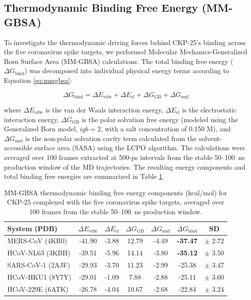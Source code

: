 \documentclass[pharmaceuticals,article,submit,pdftex,moreauthors]{Definitions/mdpi}
\begin{document}
\subsection{Thermodynamic Binding Free Energy (MM-GBSA)}
\label{sec:MM-GBSA}
To investigate the thermodynamic driving forces behind CKP-25's binding across the five coronavirus spike targets, we performed Molecular Mechanics-Generalized Born Surface Area (MM-GBSA) calculations. The total binding free energy ($\Delta G_{\text{bind}}$) was decomposed into individual physical energy terms according to Equation \ref{eq:mmgbsa}:
\begin{linenomath}
\begin{equation}\label{eq:mmgbsa}
    \Delta G_{\text{bind}} = \Delta E_{\text{vdw}} + \Delta E_{\text{el}} + \Delta G_{\text{GB}} + \Delta G_{\text{surf}}
\end{equation}
\end{linenomath}
where $\Delta E_{\text{vdw}}$ is the van der Waals interaction energy, $\Delta E_{\text{el}}$ is the electrostatic interaction energy, $\Delta G_{\text{GB}}$ is the polar solvation free energy (modeled using the Generalized Born model, $igb=2$, with a salt concentration of 0.150 M), and $\Delta G_{\text{surf}}$ is the non-polar solvation cavity term calculated from the solvent-accessible surface area (SASA) using the LCPO algorithm. The calculations were averaged over 100 frames extracted at 500-ps intervals from the stable 50--100~ns production window of the MD trajectories. The resulting energy components and total binding free energies are summarized in Table \ref{DG_table}.

\begin{table}[H]
\caption{MM-GBSA thermodynamic binding free energy components (kcal/mol) for CKP-25 complexed with the five coronavirus spike targets, averaged over 100 frames from the stable 50--100~ns production window.\label{DG_table}}
\centering
\begin{tabular}{lcccccc}
\toprule
\textbf{System (PDB)} & $\Delta E_{\text{vdw}}$ & $\Delta E_{\text{el}}$ & $\Delta G_{\text{GB}}$ & $\Delta G_{\text{surf}}$ & $\Delta G_{\text{bind}}$ & \textbf{SD} \\
\midrule
MERS-CoV (4KR0)   & -41.90 & -3.88 & 12.79  & -4.49 & \textbf{-37.47} & $\pm$ 2.72 \\
HCoV-NL63 (3KBH)  & -39.51 & -5.96 & 14.14  & -3.80 & \textbf{-35.12} & $\pm$ 3.50 \\
SARS-CoV-1 (2AJF) & -29.93 & -3.70 & 11.23  & -2.99 & -25.38          & $\pm$ 3.47 \\
HCoV-HKU1 (8Y7Y)  & -29.01 & -1.09 & 7.88   & -2.88 & -25.11          & $\pm$ 3.60 \\
HCoV-229E (6ATK)  & -26.78 & -4.04 & 10.67  & -2.68 & -22.84          & $\pm$ 3.24 \\
\bottomrule
\end{tabular}
\end{table}
\end{document}
